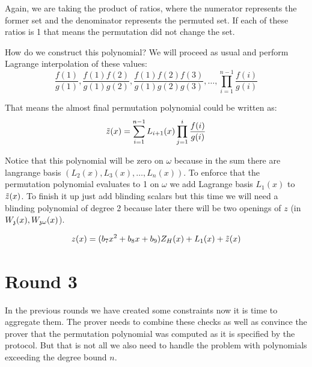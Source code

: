 Again, we are taking the product of ratios, where the numerator represents the former set and the denominator represents the permuted set. If each of these ratios is 1 that means the permutation did not change the set.

How do we construct this polynomial? We will proceed as usual and perform Lagrange interpolation of these values:
$$\frac{f(1)}{g(1)}, \frac{f(1)f(2)}{g(1)g(2)}, \frac{f(1)f(2)f(3)}{g(1)g(2)g(3)}, \ldots, \prod_{i=1}^{n-1} \frac{f(i)}{g(i)}$$

That means the almost final permutation polynomial could be written as:
$$\Tilde{z}(x) = \sum_{i=1}^{n-1} L_{i+1}(x) \prod_{j=1}^i \frac{f(i)}{g(i)}$$

Notice that this polynomial will be zero on $\omega$ because in the sum there are langrange basis $(L_2(x), L_3(x), \ldots, L_n(x))$. To enforce that the permutation polynomial evaluates to 1 on $\omega$ we add Lagrange basis $L_1(x)$ to $\Tilde{z}(x)$. To finish it up just add blinding scalars but this time we will need a blinding polynomial of degree 2 because later there will be two openings of $z$ (in $W_{\mathfrak{z}}(x), W_{\mathfrak{z}\omega}(x)$).

\begin{equation}
    z(x) = (b_7x^2 +b_8x +b_9)Z_H(x) + L_1(x) + \Tilde{z}(x)
\end{equation}




\section{Round 3}
\label{chap:round3}

In the previous rounds we have created some constraints now it is time to aggregate them. The prover needs to combine these checks as well as convince the prover that the permutation polynomial was computed as it is specified by the protocol. But that is not all we also need to handle the problem with polynomials exceeding the degree bound $n$. 

